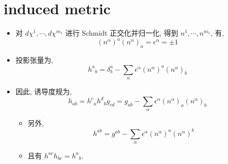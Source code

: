 \section{induced metric}
\begin{itemize}
	\item 对 $d\chi^1, \cdots, d\chi^{m_1}$ 进行 Schmidt 正交化并归一化, 得到 $n^1, \cdots, n^{m_1}$, 有,
	\begin{equation}
		(n^\alpha)^a (n^\alpha)_a = \epsilon^\alpha = \pm 1
	\end{equation}
	
	\item 投影张量为,
	\begin{equation}
		{h^a}_b = \delta^a_b - \sum_\alpha \epsilon^\alpha (n^\alpha)^a (n^\alpha)_b
	\end{equation}
	
	\item 因此, 诱导度规为,
	\begin{equation} \label{C.1.3}
		h_{a b} = {h^c}_a {h^d}_b g_{c d} = g_{a b} - \sum_\alpha \epsilon^\alpha (n^\alpha)_a (n^\alpha)_b
	\end{equation}
	\begin{itemize}
		\item 另外,
		\begin{equation}
			h^{a b} = g^{a b} - \sum_\alpha \epsilon^\alpha (n^\alpha)^a (n^\alpha)^b
		\end{equation}
		
		\item 且有 $h^{a c} h_{b c} = {h^a}_b$.
	\end{itemize}
\end{itemize}

